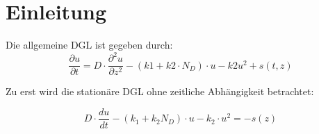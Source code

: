 \chapter{Einleitung}
Die allgemeine DGL ist gegeben durch:
\begin{equation}
	\frac{\partial u}{\partial t}= D\cdot\frac{\partial ^2 u }{\partial z^2}-(k1+k2\cdot N_D)\cdot u -k2u^2 +s(t,z)
\end{equation}

Zu erst wird die stationäre DGL ohne zeitliche Abhängigkeit betrachtet:

\begin{equation}
	D\cdot \frac{du}{dt} -\left( k_1 +k_2 N_D\right)\cdot u-k_2\cdot u^2=-s(z)
\end{equation}


